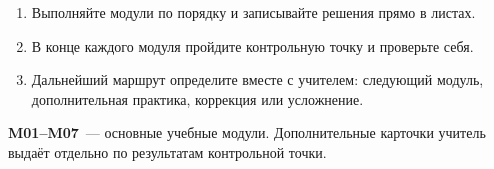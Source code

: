 \clearpage
\thispagestyle{firstpage}
\tableofcontents

\vspace{1.2em}

\begin{notebox}
  \begin{enumerate}
    \item Выполняйте модули по порядку и записывайте решения прямо в листах.
    \item В конце каждого модуля пройдите контрольную точку и проверьте себя.
    \item Дальнейший маршрут определите вместе с учителем: следующий модуль,
      дополнительная практика, коррекция или усложнение.
  \end{enumerate}
\end{notebox}

\begin{reflectionbox}
  \textbf{M01--M07}~--- основные учебные модули.
  Дополнительные карточки учитель выдаёт отдельно по результатам контрольной
  точки.
\end{reflectionbox}


\technicalblankpage


\technicalblankpage


\technicalblankpage



